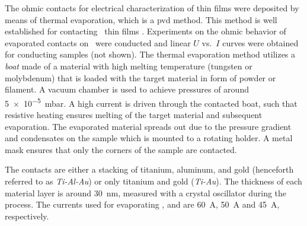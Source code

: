 The ohmic contacts for electrical characterization of  thin films were deposited by means of thermal evaporation, which is a \gls{pvd} method.
This method is well established for contacting \agao\ thin films
    \cite{vogt2023}.
Experiments on the ohmic behavior of evaporated contacts on \cro\ were conducted and linear $U$ vs.\ $I$ curves were obtained for conducting samples (not shown).
The thermal evaporation method utilizes a \emph{boat} made of a material with high melting temperature (tungsten or molybdenum) that is loaded with the target material in form of powder or filament.
A vacuum chamber is used to achieve pressures of around \qty{5e-5}{\milli\bar}.
A high current is driven through the contacted boat, such that resistive heating ensures melting of the target material and subsequent evaporation.
The evaporated material spreads out due to the pressure gradient and condensates on the sample which is mounted to a rotating holder.
A metal mask ensures that only the corners of the sample are contacted.

The contacts are either a stacking of titanium, aluminum, and gold (henceforth referred to as \emph{Ti-Al-Au}) or only titanium and gold (\emph{Ti-Au}).
The thickness of each material layer is around \qty{30}{\nm}, measured with a crystal oscillator during the process.
The currents used for evaporating ,  and  are \qty{60}{\ampere}, \qty{50}{\ampere} and \qty{45}{\ampere}, respectively.